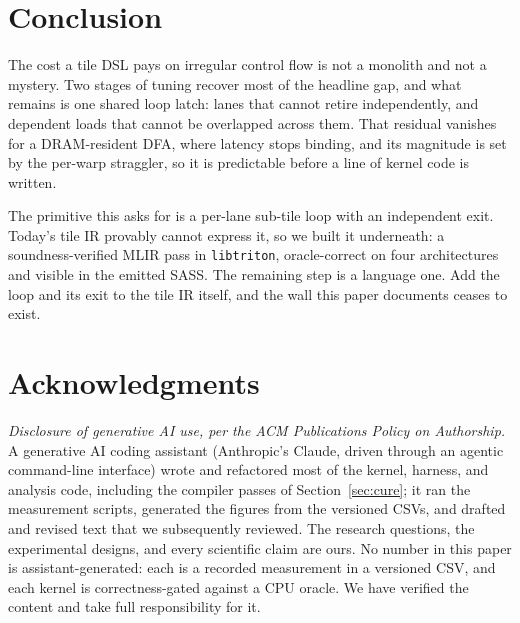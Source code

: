 \documentclass[sigplan,anonymous,review,nonacm,10pt]{acmart}
\begin{document}
\section{Conclusion}
The cost a tile DSL pays on irregular control flow is not a monolith and not a mystery. Two
stages of tuning recover most of the headline gap, and what remains is one shared loop
latch: lanes that cannot retire independently, and dependent loads that cannot be
overlapped across them. That residual vanishes for a DRAM-resident DFA, where latency stops
binding, and its magnitude is set by the per-warp straggler, so it is predictable before a
line of kernel code is written.

The primitive this asks for is a per-lane sub-tile loop with an independent exit. Today's
tile IR provably cannot express it, so we built it underneath: a soundness-verified MLIR
pass in \texttt{libtriton}, oracle-correct on four architectures and visible in the emitted
SASS. The remaining step is a language one. Add the loop and its exit to the tile IR itself,
and the wall this paper documents ceases to exist.

\clearpage

\section*{Acknowledgments}
\emph{Disclosure of generative AI use, per the ACM Publications Policy on
Authorship.} A generative AI coding assistant (Anthropic's Claude, driven through
an agentic command-line interface) wrote and refactored most of the kernel,
harness, and analysis code, including the compiler passes of
Section~\ref{sec:cure}; it ran the measurement scripts, generated the figures from
the versioned CSVs, and drafted and revised text that we subsequently reviewed. The
research questions, the experimental designs, and every scientific claim are ours.
No number in this paper is assistant-generated: each is a recorded measurement in a
versioned CSV, and each kernel is correctness-gated against a CPU oracle. We have
verified the content and take full responsibility for it.



\end{document}
